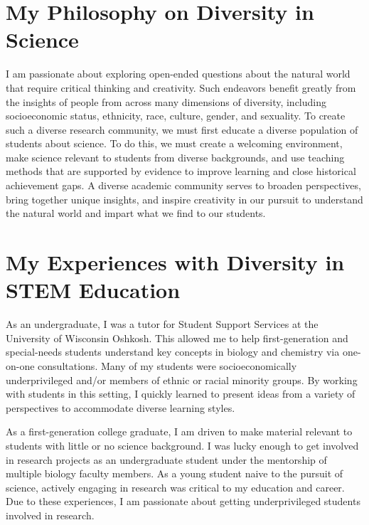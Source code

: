 \section*{My Philosophy on Diversity in Science}
I am passionate about exploring open-ended questions about the natural world
that require critical thinking and creativity.
Such endeavors benefit greatly from the insights of people from across
many dimensions of diversity,
including socioeconomic status, ethnicity, race, culture, gender, and
sexuality.
To create such a diverse research community, we must first educate a diverse
population of students about science.
To do this, we must
create a welcoming environment,
make science relevant to students from diverse backgrounds,
and
use teaching methods that are supported by evidence to improve learning and
close historical achievement gaps.
A diverse academic community serves to broaden perspectives, bring together
unique insights, and inspire creativity in our pursuit to understand the
natural world and impart what we find to our students.

\section*{My Experiences with Diversity in STEM Education}
As an undergraduate, I was a tutor for Student Support Services at the
University of Wisconsin Oshkosh.
This allowed me to help first-generation and special-needs students understand
key concepts in biology and chemistry via one-on-one consultations.
Many of my students were socioeconomically underprivileged and/or members of
ethnic or racial minority groups.
By working with students in this setting, I quickly learned to present ideas
from a variety of perspectives to accommodate diverse learning styles.

As a first-generation college graduate, I am driven
to make material relevant to students with little or no science background.
I was lucky enough to get involved in research projects as an undergraduate
student under the mentorship of multiple biology faculty members.
As a young student naive to the pursuit of science, actively engaging in
research was critical to my education and career.
Due to these experiences, I am passionate about getting underprivileged
students involved in research.

